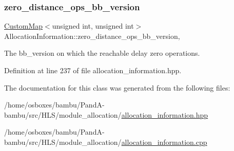 \subsubsection{\texorpdfstring{zero\+\_\+distance\+\_\+ops\+\_\+bb\+\_\+version}{zero\_distance\_ops\_bb\_version}}
{\footnotesize\ttfamily \hyperlink{custom__map_8hpp_a18ca01763abbe3e5623223bfe5aaac6b}{Custom\+Map}$<$unsigned int, unsigned int$>$ Allocation\+Information\+::zero\+\_\+distance\+\_\+ops\+\_\+bb\+\_\+version\hspace{0.3cm}{\ttfamily [mutable]}, {\ttfamily [private]}}



The bb\+\_\+version on which the reachable delay zero operations. 



Definition at line 237 of file allocation\+\_\+information.\+hpp.



The documentation for this class was generated from the following files\+:\begin{DoxyCompactItemize}
\item 
/home/osboxes/bambu/\+Pand\+A-\/bambu/src/\+H\+L\+S/module\+\_\+allocation/\hyperlink{allocation__information_8hpp}{allocation\+\_\+information.\+hpp}\item 
/home/osboxes/bambu/\+Pand\+A-\/bambu/src/\+H\+L\+S/module\+\_\+allocation/\hyperlink{allocation__information_8cpp}{allocation\+\_\+information.\+cpp}\end{DoxyCompactItemize}
